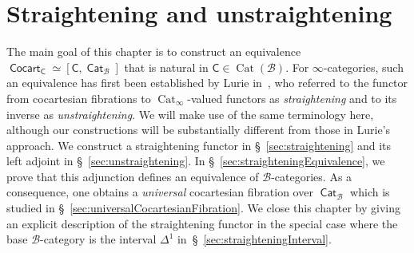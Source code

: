 \documentclass[reqno]{amsart}
\numberwithin{equation}{subsection}
\theoremstyle{plain}
\theoremstyle{definition}
\let\scr=\mathcal
\def\BB{\scr B}
\DeclareMathOperator{\Cat}{Cat}
\DeclareMathOperator{\ICat}{\mathsf{Cat}}
\DeclareMathOperator{\ICocart}{\mathsf{Cocart}}
\newcommand{\I}[1]{\mathsf{#1}}
\newcommand{\iFun}[2]{{[#1,#2]}}
\newcommand{\CatS}{\Cat_{\infty}}
\begin{document}
\section{Straightening and unstraightening}
\label{sec:SU}
The main goal of this chapter is to construct an equivalence $\ICocart_{\I{C}}\simeq\iFun{\I{C}}{\ICat_{\BB}}$ that is natural in $\I{C}\in\Cat(\BB)$. For $\infty$-categories, such an equivalence has first been established by Lurie in~\cite{htt}, who referred to the functor from cocartesian fibrations to $\CatS$-valued functors as \emph{straightening} and to its inverse as \emph{unstraightening}. We will make use of the same terminology here, although our constructions will be substantially different from those in Lurie's approach. We construct a straightening functor in \S~\ref{sec:straightening} and its left adjoint in \S~\ref{sec:unstraightening}. In \S~\ref{sec:straighteningEquivalence}, we prove that this adjunction defines an equivalence of $\BB$-categories. As a consequence, one obtains a \emph{universal} cocartesian fibration over $\ICat_{\BB}$ which is studied in \S~\ref{sec:universalCocartesianFibration}. We close this chapter by giving an explicit description of the straightening functor in the special case where the base $\BB$-category is the interval $\Delta^1$ in~\S~\ref{sec:straighteningInterval}.
\end{document}
